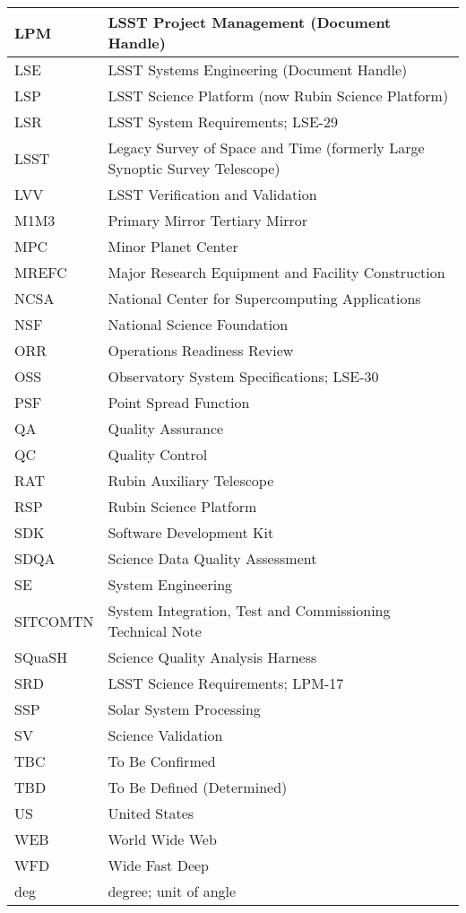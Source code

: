\begin{longtable}{p{}p{}}
LPM & LSST Project Management (Document Handle) \\\hline
LSE & LSST Systems Engineering (Document Handle) \\\hline
LSP & LSST Science Platform (now Rubin Science Platform) \\\hline
LSR & LSST System Requirements; LSE-29 \\\hline
LSST & Legacy Survey of Space and Time (formerly Large Synoptic Survey Telescope) \\\hline
LVV & LSST Verification and Validation \\\hline
M1M3 & Primary Mirror Tertiary Mirror \\\hline
MPC & Minor Planet Center \\\hline
MREFC & Major Research Equipment and Facility Construction \\\hline
NCSA & National Center for Supercomputing Applications \\\hline
NSF & National Science Foundation \\\hline
ORR & Operations Readiness Review \\\hline
OSS & Observatory System Specifications; LSE-30 \\\hline
PSF & Point Spread Function \\\hline
QA & Quality Assurance \\\hline
QC & Quality Control \\\hline
RAT & Rubin Auxiliary Telescope \\\hline
RSP & Rubin Science Platform \\\hline
SDK & Software Development Kit \\\hline
SDQA & Science Data Quality Assessment \\\hline
SE & System Engineering \\\hline
SITCOMTN & System Integration, Test and Commissioning Technical Note \\\hline
SQuaSH & Science Quality Analysis Harness \\\hline
SRD & LSST Science Requirements; LPM-17 \\\hline
SSP & Solar System Processing \\\hline
SV & Science Validation \\\hline
TBC & To Be Confirmed \\\hline
TBD & To Be Defined (Determined) \\\hline
US & United States \\\hline
WEB & World Wide Web \\\hline
WFD & Wide Fast Deep \\\hline
deg & degree; unit of angle \\\hline
\end{longtable}

